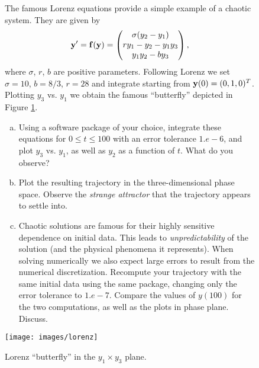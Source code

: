 \begin{figure}
  
  \begin{problem}[A\&P 5.5]
    The famous Lorenz equations provide a simple example of a chaotic system. They are given by
    \[
      \mathbf{y}' = \mathbf{f}(\mathbf{y}) = 
      \begin{pmatrix}
        \sigma(y_2 - y_1) \\
        r y_1 - y_2 - y_1 y_3 \\
        y_1 y_2 - b y_3
      \end{pmatrix},
    \]
    where $\sigma$, $r$, $b$ are positive parameters. Following Lorenz we set $\sigma = 10$, $b = 8/3$, $r = 28$ and integrate starting from $\mathbf{y}(0) = (0, 1, 0)^T$. Plotting $y_3$ vs. $y_1$ we obtain the famous ``butterfly'' depicted in Figure \ref{F:lorenz}.
    \begin{enumerate}[(a)]
      \item Using a software package of your choice, integrate these equations for $0 \leq t \leq 100$ with an error tolerance $1.e - 6$, and plot $y_3$ vs. $y_1$, as well as $y_2$ as a function of $t$. What do you observe?
      \item Plot the resulting trajectory in the three-dimensional phase space. Observe the \emph{strange attractor} that the trajectory appears to settle into.
      \item Chaotic solutions are famous for their highly sensitive dependence on initial data. This leads to \emph{unpredictability} of the solution (and the physical phenomena it represents). When solving numerically we also expect large errors to result from the numerical discretization. Recompute your trajectory with the same initial data using the same package, changing only the error tolerance to $1.e - 7$. Compare the values of $y(100)$ for the two computations, as well as the plots in phase plane. Discuss.
    \end{enumerate}
  
    \centering
    \texttt{[image: images/lorenz]}
    \caption{Lorenz ``butterfly'' in the $y_1 \times y_3$ plane.}
    \label{F:lorenz}
  \end{problem}
\end{figure}

\FloatBarrier

